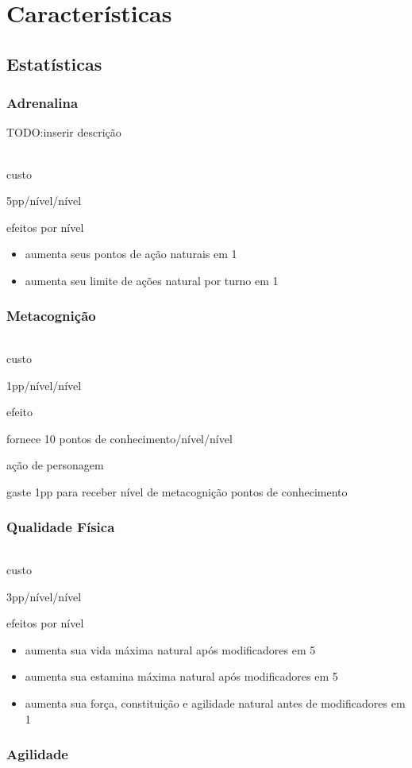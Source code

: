 \part{Características}
\chapter{Estatísticas}
\section{Adrenalina}
TODO:inserir descrição
\paragraph{}
\subparagraph{custo} 5pp/nível/nível
\subparagraph{efeitos por nível} 
\begin{itemize}
  \item aumenta seus pontos de ação naturais em 1 
  \item aumenta seu limite de ações natural por turno em 1 
\end{itemize}
\section{Metacognição}
\paragraph{}
\subparagraph{custo} 1pp/nível/nível
\subparagraph{efeito} fornece 10 pontos de conhecimento/nível/nível
\subparagraph{ação de personagem} gaste 1pp para receber nível de metacognição pontos de conhecimento
\section{Qualidade Física}
\paragraph{}
\subparagraph{custo} 3pp/nível/nível
\subparagraph{efeitos por nível} 
\begin{itemize}
    \item aumenta sua vida máxima natural após modificadores em 5
    \item aumenta sua estamina máxima natural após modificadores em 5
    \item aumenta sua força, constituição e agilidade natural antes de modificadores em 1
\end{itemize}
\section{Agilidade}
